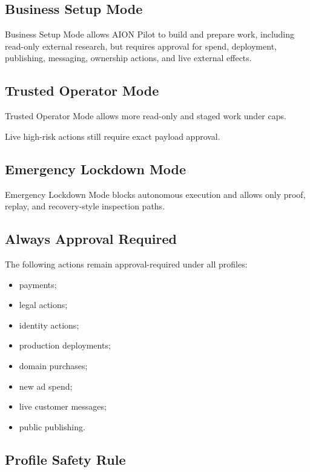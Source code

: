 \subsection{Business Setup Mode}

Business Setup Mode allows AION Pilot to build and prepare work, including read-only external research, but requires approval for spend, deployment, publishing, messaging, ownership actions, and live external effects.

\subsection{Trusted Operator Mode}

Trusted Operator Mode allows more read-only and staged work under caps.

Live high-risk actions still require exact payload approval.

\subsection{Emergency Lockdown Mode}

Emergency Lockdown Mode blocks autonomous execution and allows only proof, replay, and recovery-style inspection paths.

\subsection{Always Approval Required}

The following actions remain approval-required under all profiles:

\begin{itemize}
  \item payments;
  \item legal actions;
  \item identity actions;
  \item production deployments;
  \item domain purchases;
  \item new ad spend;
  \item live customer messages;
  \item public publishing.
\end{itemize}

\subsection{Profile Safety Rule}

